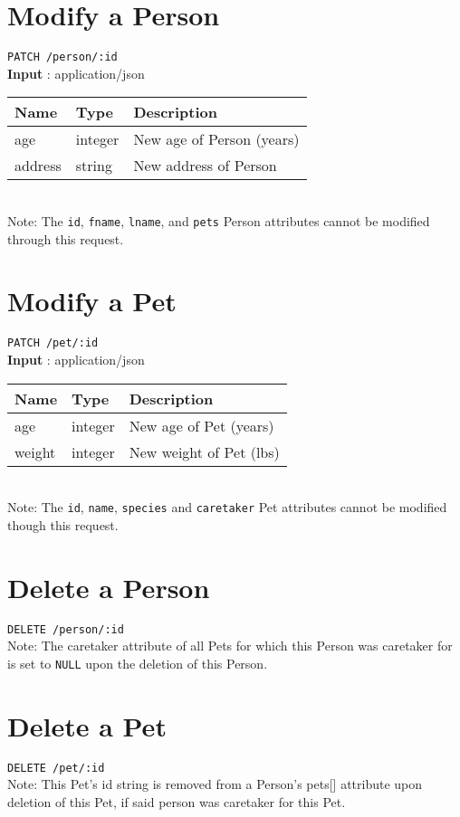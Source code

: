 \documentclass{article}
\begin{document}
\section*{Modify a Person}
\texttt{PATCH /person/:id} \\
\textbf{Input} : application/json \\
\begin{tabular}{| l | l | l |}
	\hline
	\textbf{Name} & \textbf{Type} & \textbf{Description} \\
	\hline
	age           & integer       & New age of Person (years) \\
	\hline
	address       & string        & New address of Person \\
	\hline
\end{tabular}
\\
Note: The \texttt{id}, \texttt{fname}, \texttt{lname}, and \texttt{pets}
Person attributes cannot be modified through this request.

\section*{Modify a Pet}
\texttt{PATCH /pet/:id} \\
\textbf{Input} : application/json \\
\begin{tabular}{| l | l | l |}
	\hline
	\textbf{Name} & \textbf{Type} & \textbf{Description} \\
	\hline
	age           & integer        & New age of Pet (years) \\
	\hline
	weight        & integer        & New weight of Pet (lbs) \\
	\hline
\end{tabular}
\\
Note: The \texttt{id}, \texttt{name}, \texttt{species} and \texttt{caretaker} 
Pet attributes cannot be modified though this request.

\section*{Delete a Person}
\texttt{DELETE /person/:id} \\
Note: The caretaker attribute of all Pets for which this Person was caretaker for
is set to \texttt{NULL} upon the deletion of this Person.

\section*{Delete a Pet}
\texttt{DELETE /pet/:id} \\
Note: This Pet's id string is removed from a Person's pets[] attribute upon
deletion of this Pet, if said person was caretaker for this Pet.
\end{document}
